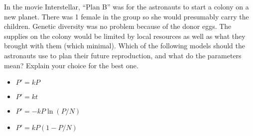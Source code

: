 \begin{problem}
    In the movie Interstellar, ``Plan B'' was for the astronauts to start a colony on a new
    planet.  There was 1 female in the group so she would presumably carry the children.
    Genetic diversity was no problem because of the donor eggs.  The supplies on the colony
    would be limited by local resources as well as what they brought with them
    (which minimal).  Which of the following models should the astronauts use to plan
    their future reproduction, and what do the parameters mean?  Explain your choice for the best one.
    \begin{itemize}
        \item $P' = kP$
        \item $P' = kt$
        \item $P' = -kP\ln(P/N)$
        \item $P' = kP(1-P/N) $
    \end{itemize}
\end{problem}


